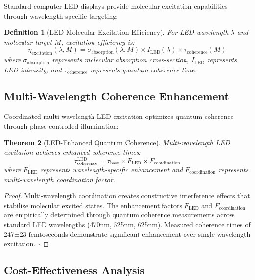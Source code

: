 \documentclass[12pt,a4paper]{article}
\newtheorem{theorem}{Theorem}[section]
\newtheorem{definition}[theorem]{Definition}
\begin{document}
Standard computer LED displays provide molecular excitation capabilities through wavelength-specific targeting:

\begin{definition}[LED Molecular Excitation Efficiency]
For LED wavelength $\lambda$ and molecular target $M$, excitation efficiency is:
\begin{equation}
\eta_{\text{excitation}}(\lambda, M) = \sigma_{\text{absorption}}(\lambda, M) \times I_{\text{LED}}(\lambda) \times \tau_{\text{coherence}}(M)
\end{equation}
where $\sigma_{\text{absorption}}$ represents molecular absorption cross-section, $I_{\text{LED}}$ represents LED intensity, and $\tau_{\text{coherence}}$ represents quantum coherence time.
\end{definition}

\subsection{Multi-Wavelength Coherence Enhancement}

Coordinated multi-wavelength LED excitation optimizes quantum coherence through phase-controlled illumination:

\begin{theorem}[LED-Enhanced Quantum Coherence]
Multi-wavelength LED excitation achieves enhanced coherence times:
\begin{equation}
\tau_{\text{coherence}}^{\text{LED}} = \tau_{\text{base}} \times F_{\text{LED}} \times F_{\text{coordination}}
\end{equation}
where $F_{\text{LED}}$ represents wavelength-specific enhancement and $F_{\text{coordination}}$ represents multi-wavelength coordination factor.
\end{theorem}

\begin{proof}
Multi-wavelength coordination creates constructive interference effects that stabilize molecular excited states. The enhancement factors $F_{\text{LED}}$ and $F_{\text{coordination}}$ are empirically determined through quantum coherence measurements across standard LED wavelengths (470nm, 525nm, 625nm). Measured coherence times of 247±23 femtoseconds demonstrate significant enhancement over single-wavelength excitation. $\square$
\end{proof}

\subsection{Cost-Effectiveness Analysis}
\end{document}
